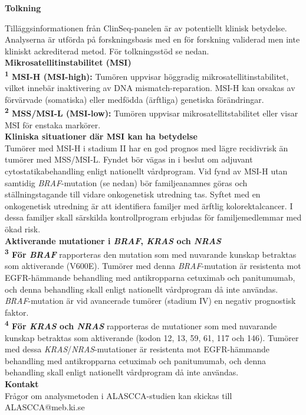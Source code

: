 \documentclass[10pt]{article}
\begin{document}
\vspace{0.3cm}

\textbf{Tolkning} \par
{\small
Tilläggsinformationen från ClinSeq-panelen är av potentiellt klinisk betydelse. Analyserna är utförda på forskningsbasis med en för forskning validerad men inte kliniskt ackrediterad metod. För tolkningsstöd se nedan. \\

\textbf{Mikrosatellitinstabilitet (MSI)}\\
\textbf{\textsuperscript{1} MSI-H (MSI-high):} Tumören uppvisar höggradig mikrosatellitinstabilitet, vilket innebär inaktivering av DNA mismatch-reparation. MSI-H kan orsakas av förvärvade (somatiska) eller medfödda (ärftliga) genetiska förändringar. \\
\textbf{\textsuperscript{2} MSS/MSI-L (MSI-low):} Tumören uppvisar mikrosatellitstabilitet eller visar MSI för enstaka markörer. \\

\textbf{Kliniska situationer där MSI kan ha betydelse}\\
Tumörer med MSI-H i stadium II har en god prognos med lägre recidivrisk än tumörer med MSS/MSI-L. Fyndet bör vägas in i beslut om adjuvant cytostatikabehandling enligt nationellt vårdprogram. Vid fynd av MSI-H utan samtidig \textit{BRAF}-mutation (se nedan) bör familjeanamnes göras och ställningstagande till vidare onkogenetisk utredning tas. Syftet med en onkogenetisk utredning är att identifiera familjer med ärftlig kolorektalcancer. I dessa familjer skall särskilda kontrollprogram erbjudas för familjemedlemmar med ökad risk. \\

\textbf{Aktiverande mutationer i \textit{BRAF}, \textit{KRAS} och \textit{NRAS}}\\
\textbf{\textsuperscript{3} För \textit{BRAF}} rapporteras den mutation som med nuvarande kunskap betraktas som aktiverande (V600E). Tumörer med denna \textit{BRAF}-mutation är resistenta mot EGFR-hämmande behandling med antikropparna cetuximab och panitumumab, och denna behandling skall enligt nationellt vårdprogram då inte användas. \textit{BRAF}-mutation är vid avancerade tumörer (stadium IV) en negativ prognostisk faktor. \\
\textbf{\textsuperscript{4} För \textit{KRAS} och \textit{NRAS}} rapporteras de mutationer som med nuvarande kunskap betraktas som aktiverande (kodon 12, 13, 59, 61, 117 och 146). Tumörer med dessa \textit{KRAS}/\textit{NRAS}-mutationer är resistenta mot EGFR-hämmande behandling med antikropparna cetuximab och panitumumab, och denna behandling skall enligt nationellt vårdprogram då inte användas. \\

\textbf{Kontakt}\\
Frågor om analysmetoden i ALASCCA-studien kan skickas till ALASCCA@meb.ki.se
}
\par
\end{document}
